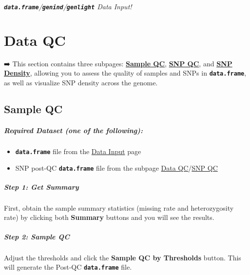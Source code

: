 \documentclass[
]{book}
\begin{document}
{\textbf{\emph{\texttt{data.frame}}}}\emph{/{\textbf{\texttt{genind}}}/{\textbf{\texttt{genlight}}} Data Input!}

\chapter{Data QC}\label{sec-data-qc}

➡️ This section contains three subpages: \ul{\textbf{Sample QC}}, \ul{\textbf{SNP QC}}, and \ul{\textbf{SNP Density}}, allowing you to assess the quality of samples and SNPs in {\textbf{\texttt{data.frame}}}, as well as visualize SNP density across the genome.

\section{Sample QC}\label{sample-qc}

\paragraph*{Required Dataset (one of the following):}\label{required-dataset-one-of-the-following-1}

\begin{itemize}
\item
  {\textbf{\texttt{data.frame}}} file from the \ul{Data Input} page
\item
  SNP post-QC {\textbf{\texttt{data.frame}}} file from the subpage \ul{Data QC}/\ul{SNP QC}
\end{itemize}

\paragraph*{Step 1: Get Summary}\label{step-1-get-summary}

First, obtain the sample summary statistics (missing rate and heterozygosity rate) by clicking both {\textbf{Summary}} buttons and you will see the results.

\paragraph*{Step 2: Sample QC}\label{step-2-sample-qc}

Adjust the thresholds and click the {\textbf{Sample QC by Thresholds}} button. This will generate the Post-QC {\textbf{\texttt{data.frame}}} file.
\end{document}
